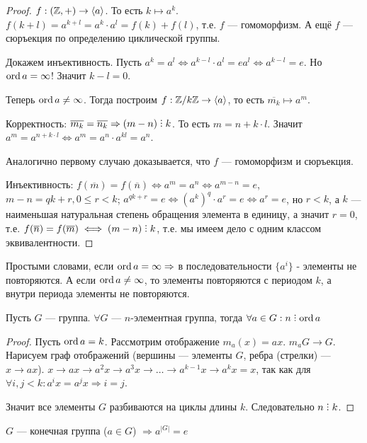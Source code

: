 \begin{proof}
    $f: (\mathbb{Z}, +) \to \langle a \rangle$. То есть  $k \mapsto a^k$.  $f(k+l) = a^{k+l} = a^k \cdot a^l = f(k) + f(l)$, т.е. $f$ --- гомоморфизм. А ещё $f$ --- сюръекция по определению циклической группы.

    Докажем инъективность. Пусть $a^k = a^l \iff a^{k-l} \cdot a^l = e a^l \iff a^{k-l} = e$. Но  $\operatorname{ord} a = \infty$! Значит $k-l=0$.  

    Теперь $\operatorname{ord} a \neq \infty$. Тогда построим  $f: \mathbb{Z} / k \mathbb{Z} \to \langle a \rangle$, то есть  $\overline{m_k} \mapsto a^m$.

    Корректность:  $\overline{m_k} = \overline{n_k} \Rightarrow (m - n) \divby k$. То есть $m = n + k \cdot l$. Значит  $a^m = a^{n + k \cdot l} \iff a^m = a^n \cdot a^{kl} = a^n$.

    Аналогично первому случаю доказывается, что $f$ --- гомоморфизм и сюръекция.

    Инъективность: $f(\overline{m}) = f(\overline{n}) \iff a^m = a^n \iff a^{m-n} = e$, $m-n = qk + r, 0 \le r < k$; $a^{qk + r} = e \iff (a^k)^q \cdot a^r = e \iff a^r = e$, но $r < k$, а $k$ --- наименьшая натуральная степень обращения элемента в единицу, а значит $r = 0$, т.е. $f(\overline{n}) = f(\overline{m}) \iff (m - n) \divby k$, т.е. мы имеем дело с одним классом эквивалентности.
    
\end{proof}
\slashn
Простыми словами, если $\operatorname{ord} a = \infty \Rightarrow$ в последовательности $\{a^i\}$ - элементы не повторяются. А если  $\operatorname{ord} a \neq \infty$, то элементы повторяются с периодом $k$, а внутри периода элементы не повторяются. 
\begin{theorem}
    Пусть $G$ --- группа.  $\forall G$ ---  $n$-элементная группа, тогда  $\forall a \in G: n \divby \ord a$
\end{theorem}
\begin{proof}
    Пусть $\operatorname{ord} a = k$.
    Рассмотрим отображение $m_a(x) = ax$. $m_a G \to G$. Нарисуем граф отображений (вершины --- элементы $G$, ребра (стрелки) ---  $x \to ax$). $x \to ax \to a^2x \to a^3x \to \ldots \to a^{k-1}x \to a^kx = x$, так как для $\forall i, j < k: a^i x = a^j x \Rightarrow i = j$. 

    Значит все элементы $G$ разбиваются на циклы длины  $k$. Следовательно $n \divby k$.
\end{proof}
\begin{consequence}
    $G$ --- конечная группа ($a \in G$) $\Rightarrow a^{|G|} = e$
\end{consequence}
